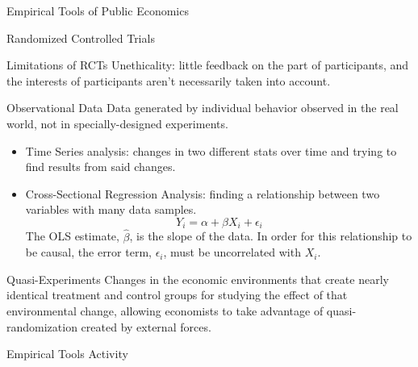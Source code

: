 \documentclass[10pt]{extarticle}
\begin{document}
\begin{problem}{Empirical Tools of Public Economics}
\begin{problem}{Randomized Controlled Trials}
\begin{problem}{Limitations of RCTs}
        Unethicality: little feedback on the part of participants, and the interests of participants aren't necessarily taken into account.
      \end{problem}
    \end{problem}
    \begin{problem}{Observational Data}
      Data generated by individual behavior observed in the real world, not in specially-designed experiments.
      \begin{itemize}
        \item Time Series analysis: changes in two different stats over time and trying to find results from said changes.
        \item Cross-Sectional Regression Analysis: finding a relationship between two variables with many data samples.
          \[
            Y_i = \alpha + \beta X_i + \epsilon_i
          \] 
          The OLS estimate, $\hat{\beta}$, is the slope of the data. In order for this relationship to be causal, the error term, $\epsilon_i$, must be uncorrelated with $X_i$.
      \end{itemize}
    \end{problem}
    \begin{problem}{Quasi-Experiments}
      Changes in the economic environments that create nearly identical treatment and control groups for studying the effect of that environmental change, allowing economists to take advantage of quasi-randomization created by external forces.
    \end{problem}
  \end{problem}
  \begin{problem}{Empirical Tools Activity}
   \begin{tcbraster}[raster columns = 1,colframe = black!75!white,colback=white]
   \end{tcbraster}
  \end{problem}
\end{document}

